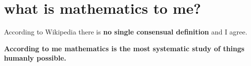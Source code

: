\documentclass[./main.tex]{subfiles}
\begin{document}
\chapter{what is mathematics to me?}

According to Wikipedia there is \textbf{no single consensual definition} and I agree.
\begin{definition}
  \label{def:mathematics}

  \textbf{According to me mathematics is the most systematic study of things humanly possible.}

\end{definition}
\end{document}
